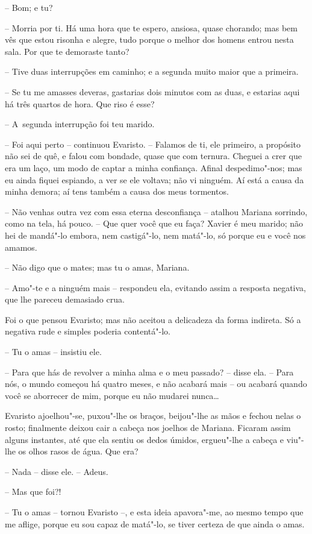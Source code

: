 -- Bom; e tu?

-- Morria por ti. Há uma hora que te espero, ansiosa, quase chorando;
mas bem vês que estou risonha e alegre, tudo porque o melhor dos homens
entrou nesta sala. Por que te demoraste tanto?

-- Tive duas interrupções em caminho; e a segunda muito maior que a
primeira.

-- Se tu me amasses deveras, gastarias dois minutos com as duas, e
estarias aqui há três quartos de hora. Que riso é esse?

-- A~segunda interrupção foi teu marido.

-- Foi aqui perto -- continuou Evaristo. -- Falamos de ti, ele primeiro,
a propósito não sei de quê, e falou com bondade, quase que com ternura.
Cheguei a crer que era um laço, um modo de captar a minha confiança.
Afinal despedimo"-nos; mas eu ainda fiquei espiando, a ver se ele
voltava; não vi ninguém. Aí está a causa da minha demora; aí tens também
a causa dos meus tormentos.

-- Não venhas outra vez com essa eterna desconfiança -- atalhou Mariana
sorrindo, como na tela, há pouco. -- Que quer você que eu faça? Xavier é
meu marido; não hei de mandá"-lo embora, nem castigá"-lo, nem matá"-lo, só
porque eu e você nos amamos.

-- Não digo que o mates; mas tu o amas, Mariana.

-- Amo"-te e a ninguém mais -- respondeu ela, evitando assim a resposta
negativa, que lhe pareceu demasiado crua.

Foi o que pensou Evaristo; mas não aceitou a delicadeza da forma
indireta. Só a negativa rude e simples poderia contentá"-lo.

-- Tu o amas -- insistiu ele.

-- Para que hás de revolver a minha alma e o meu passado? -- disse ela.
-- Para nós, o mundo começou há quatro meses, e não acabará mais -- ou
acabará quando você se aborrecer de mim, porque eu não mudarei nunca\ldots{}

Evaristo ajoelhou"-se, puxou"-lhe os braços, beijou"-lhe as mãos e fechou
nelas o rosto; finalmente deixou cair a cabeça nos joelhos de Mariana.
Ficaram assim alguns instantes, até que ela sentiu os dedos úmidos,
ergueu"-lhe a cabeça e viu"-lhe os olhos rasos de água. Que era?

-- Nada -- disse ele. -- Adeus.

-- Mas que foi?!

-- Tu o amas -- tornou Evaristo --, e esta ideia apavora"-me, ao mesmo
tempo que me aflige, porque eu sou capaz de matá"-lo, se tiver certeza de
que ainda o amas.

